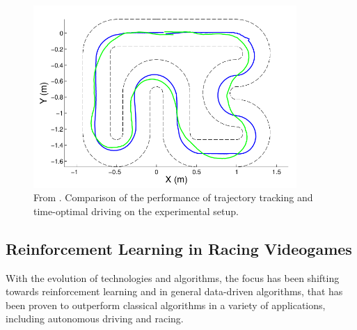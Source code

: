 \begin{figure}
 \centering
  \captionsetup{width=10cm}
  \includegraphics[width=10cm]{./img/mpc-comparison}
  \caption{From \cite{mpc}. Comparison of the performance of trajectory tracking and time-optimal driving on the experimental setup.}
\end{figure}

\subsection{Reinforcement Learning in Racing Videogames}

With the evolution of technologies and algorithms, the focus has been shifting towards reinforcement learning and in general data-driven algorithms, that has been proven to outperform classical algorithms in a variety of applications, including autonomous driving and racing.


